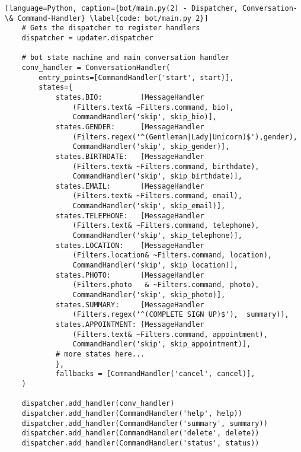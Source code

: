         \begin{lstlisting}[language=Python, caption={bot/main.py(2) - Dispatcher, Conversation- \& Command-Handler} \label{code: bot/main.py 2}]
    # Gets the dispatcher to register handlers
    dispatcher = updater.dispatcher
    
    # bot state machine and main conversation handler
    conv_handler = ConversationHandler(
        entry_points=[CommandHandler('start', start)],
        states={
            states.BIO:         [MessageHandler
                (Filters.text& ~Filters.command, bio), 
                CommandHandler('skip', skip_bio)],
            states.GENDER:      [MessageHandler
                (Filters.regex('^(Gentleman|Lady|Unicorn)$'),gender), 
                CommandHandler('skip', skip_gender)],
            states.BIRTHDATE:   [MessageHandler
                (Filters.text& ~Filters.command, birthdate), 
                CommandHandler('skip', skip_birthdate)],
            states.EMAIL:       [MessageHandler
                (Filters.text& ~Filters.command, email), 
                CommandHandler('skip', skip_email)],
            states.TELEPHONE:   [MessageHandler
                (Filters.text& ~Filters.command, telephone), 
                CommandHandler('skip', skip_telephone)],
            states.LOCATION:    [MessageHandler
                (Filters.location& ~Filters.command, location), 
                CommandHandler('skip', skip_location)],
            states.PHOTO:       [MessageHandler
                (Filters.photo   & ~Filters.command, photo), 
                CommandHandler('skip', skip_photo)],
            states.SUMMARY:     [MessageHandler
                (Filters.regex('^(COMPLETE SIGN UP)$'),  summary)],
            states.APPOINTMENT: [MessageHandler
                (Filters.text& ~Filters.command, appointment), 
                CommandHandler('skip', skip_appointment)],
            # more states here...
            },
            fallbacks = [CommandHandler('cancel', cancel)],
    )

    dispatcher.add_handler(conv_handler)
    dispatcher.add_handler(CommandHandler('help', help))
    dispatcher.add_handler(CommandHandler('summary', summary))
    dispatcher.add_handler(CommandHandler('delete', delete))
    dispatcher.add_handler(CommandHandler('status', status))
        \end{lstlisting}

